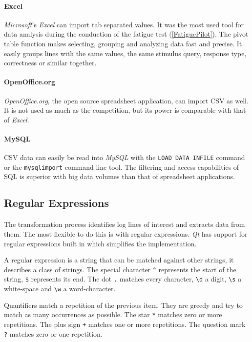 \paragraph{Excel}
\textit{Microsoft}'s \textit{Excel} can import tab separated values.
It was the most used tool for data analysis during the conduction of the fatigue test (\ref{FatiguePilot}).
The pivot table function makes selecting, grouping and analyzing data fast and precise.
It easily groups lines with the same values, the same stimulus query, response type, correctness or similar together.

\paragraph{OpenOffice.org}
\textit{OpenOffice.org}, the open source spreadsheet application, can import CSV as well.
It is not used as much as the competition, but its power is comparable with that of \textit{Excel}.

\paragraph{MySQL}
CSV data can easily be read into \textit{MySQL} with the \texttt{LOAD DATA INFILE} command or the \texttt{mysqlimport} command line tool.
The filtering and access capabilities of SQL is superior with big data volumes than that of spreadsheet applications.


\subsection{Regular Expressions}
\paragraph{}
The transformation process identifies log lines of interest and extracts data from them.
The most flexible to do this is with regular expressions.
\textit{Qt} has support for regular expressions built in which simplifies the implementation.

A regular expression is a string that can be matched against other strings, it describes a class of strings.
The special character \texttt{\^} represents the start of the string, \texttt{\$} represents its end.
The dot \texttt{.} matches every character, \texttt{\textbackslash d} a digit, \texttt{\textbackslash s} a white-space and \texttt{\textbackslash w} a word-character.

Quantifiers match a repetition of the previous item.
They are greedy and try to match as many occurrences as possible.
The star \texttt{*} matches zero or more repetitions.
The plus sign \texttt{+} matches one or more repetitions.
The question mark \texttt{?} matches zero or one repetition.

